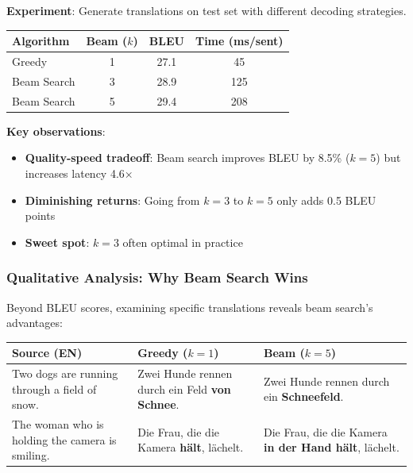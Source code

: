 \documentclass{article}
\begin{document}
\begin{tcolorbox}[colback=green!5!white, colframe=green!50!black, title=Empirical Impact: Beam Search]
\textbf{Experiment}: Generate translations on test set with different decoding strategies.

\vspace{0.3cm}
\begin{center}
\begin{tabular}{|l|c|c|c|}
\hline
\textbf{Algorithm} & \textbf{Beam ($k$)} & \textbf{BLEU} & \textbf{Time (ms/sent)} \\
\hline
Greedy & 1 & 27.1 & 45 \\
Beam Search & 3 & 28.9 & 125 \\
Beam Search & 5 & 29.4 & 208 \\
\hline
\end{tabular}
\end{center}

\vspace{0.3cm}
\textbf{Key observations}:
\begin{itemize}
\item \textbf{Quality-speed tradeoff}: Beam search improves BLEU by 8.5\% ($k=5$) but increases latency 4.6×
\item \textbf{Diminishing returns}: Going from $k=3$ to $k=5$ only adds 0.5 BLEU points
\item \textbf{Sweet spot}: $k=3$ often optimal in practice
\end{itemize}
\end{tcolorbox}

\subsubsection{Qualitative Analysis: Why Beam Search Wins}

Beyond BLEU scores, examining specific translations reveals beam search's advantages:

\begin{center}
\small
\begin{tabular}{|p{4cm}|p{5cm}|p{5cm}|}
\hline
\textbf{Source (EN)} & \textbf{Greedy ($k=1$)} & \textbf{Beam ($k=5$)} \\
\hline
Two dogs are running through a field of snow. & 
Zwei Hunde rennen durch ein Feld \textbf{von Schnee}. & 
Zwei Hunde rennen durch ein \textbf{Schneefeld}. \\
\hline
The woman who is holding the camera is smiling. & 
Die Frau, die die Kamera \textbf{hält}, lächelt. & 
Die Frau, die die Kamera \textbf{in der Hand hält}, lächelt. \\
\hline
\end{tabular}
\end{center}
\end{document}
